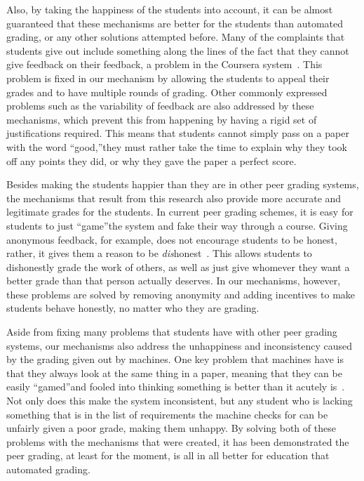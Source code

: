 \documentclass[12pt, Arial]{article}
\begin{document}
Also, by taking the happiness of the students into account, it can be almost guaranteed that these mechanisms are better for the students than automated grading, or any other solutions attempted before. Many of the complaints that students give out include something along the lines of the fact that they cannot give feedback on their feedback, a problem in the Coursera system~\cite{howaccurateispeergrading}. This problem is fixed in our mechanism by allowing the students to appeal their grades and to have multiple rounds of grading. Other commonly expressed problems such as the variability of feedback are also addressed by these mechanisms, which prevent this from happening by having a rigid set of justifications required. This means that students cannot simply pass on a paper with the word ``good,''they must rather take the time to explain why they took off any points they did, or why they gave the paper a perfect score.

Besides making the students happier than they are in other peer grading systems, the mechanisms that result from this research also provide more accurate and legitimate grades for the students. In current peer grading schemes, it is easy for students to just ``game''the system and fake their way through a course. Giving anonymous feedback, for example, does not encourage students to be honest, rather, it gives them a reason to be \emph{dis}honest~\cite{howaccurateispeergrading}. This allows students to dishonestly grade the work of others, as well as just give whomever they want a better grade than that person actually deserves. In our mechanisms, however, these problems are solved by removing anonymity and adding incentives to make students behave honestly, no matter who they are grading.

Aside from fixing many problems that students have with other peer grading systems, our mechanisms also address the unhappiness and inconsistency caused by the grading given out by machines. One key problem that machines have is that they always look at the same thing in a paper, meaning that they can be easily ``gamed''and fooled into thinking something is better than it acutely is~\cite{robogradingproblems}. Not only does this make the system inconsistent, but any student who is lacking something that is in the list of requirements the machine checks for can be unfairly given a poor grade, making them unhappy. By solving both of these problems with the mechanisms that were created, it has been demonstrated the peer grading, at least for the moment, is all in all better for education that automated grading.
\end{document}
